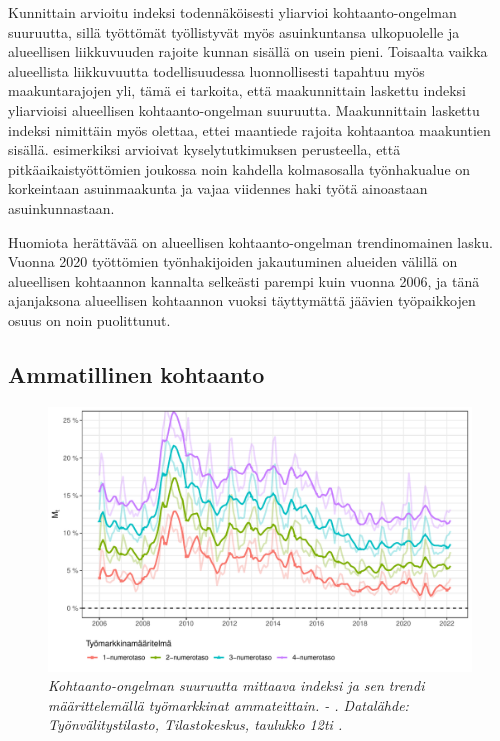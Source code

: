 \documentclass[12pt]{article}
\newcommand{\lastdatamonth}{\unskip}
\newcommand{\firstdatamonth}{\unskip}
\newcommand{\newcaption}[1]{\caption{\textit{\footnotesize{#1}}}}
\begin{document}
Kunnittain arvioitu indeksi todennäköisesti yliarvioi kohtaanto-ongelman suuruutta, sillä työttömät työllistyvät myös asuinkuntansa ulkopuolelle \cite{alasalmi2020tyon} ja alueellisen liikkuvuuden rajoite kunnan sisällä on usein pieni. Toisaalta vaikka alueellista liikkuvuutta todellisuudessa luonnollisesti tapahtuu myös maakuntarajojen yli, tämä ei tarkoita, että maakunnittain laskettu indeksi yliarvioisi alueellisen kohtaanto-ongelman suuruutta. Maakunnittain laskettu indeksi nimittäin myös olettaa, ettei maantiede rajoita kohtaantoa maakuntien sisällä.  esimerkiksi arvioivat kyselytutkimuksen perusteella, että pitkäaikaistyöttömien joukossa noin kahdella kolmasosalla työnhakualue on korkeintaan asuinmaakunta ja vajaa viidennes haki työtä ainoastaan asuinkunnastaan.  

Huomiota herättävää on alueellisen kohtaanto-ongelman trendinomainen lasku. Vuonna 2020 työttömien työnhakijoiden jakautuminen alueiden välillä on alueellisen kohtaannon kannalta selkeästi parempi kuin vuonna 2006, ja tänä ajanjaksona alueellisen kohtaannon vuoksi täyttymättä jäävien työpaikkojen osuus on noin puolittunut.

\subsection{Ammatillinen kohtaanto} \label{section:ammatillinen_kohtaanto}

\begin{figure}
\centering
\includegraphics[scale = 0.8]{../kuviot/indeksi_ammateittain.pdf}
    \newcaption{Kohtaanto-ongelman suuruutta mittaava indeksi ja sen trendi määrittelemällä työmarkkinat ammateittain. \protect \firstdatamonth \phantom{} - \protect\lastdatamonth. Datalähde: Työnvälitystilasto, Tilastokeskus, taulukko 12ti \protect \cite{svt2011}.}
   \label{fig:kd982}
\end{figure}
\end{document}
